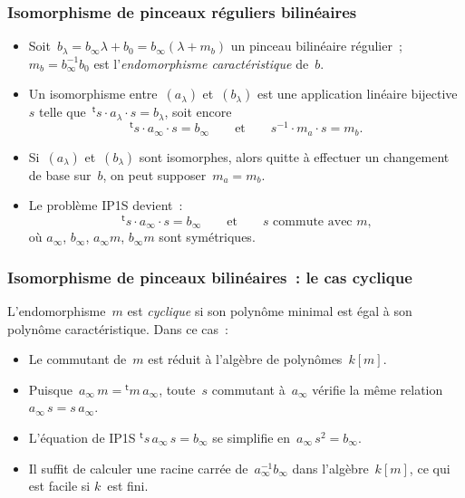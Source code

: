 \documentclass{beamer}%
\def\transpose{{}^{\mathrm{\scriptscriptstyle t}}\!}
\def\emphz#1{\emph{{\color{bleu}#1}}}
\let\mathrm\mathsf
\begin{document}
\begin{frame}\frametitle{Isomorphisme de pinceaux réguliers bilinéaires}%
\begin{itemize}
\item Soit~$b_{λ} = b_{∞} λ  + b_0 = b_{∞} ( λ + m_{b})$ un pinceau
bilinéaire régulier ; $m_{b} = b_{∞}^{-1} b_0$ est l'\emphz{endomorphisme
caractéristique} de~$b$.
\item Un isomorphisme entre~$(a_{λ})$ et~$(b_{λ})$ est une
application linéaire bijective~$s$ telle que~$\transpose{s} · a_{λ} · s =
b_{λ}$, soit encore
\begin{equation*}
\transpose{s} · a_{∞} · s = b_{∞} \qquad\text{et}\qquad
s^{-1} · m_{a} · s = m_{b}.
\end{equation*}
\item Si~$(a_{λ})$ et~$(b_{λ})$ sont isomorphes, alors quitte à effectuer
un changement de base sur~$b$, on peut supposer~$m_a = m_b$.
\item Le problème IP1S devient :
\begin{equation*}
\transpose{s} · a_{∞} · s = b_{∞} \qquad\text{et}\qquad
\text{$s$~commute avec~$m$,}
\end{equation*}
où $a_{∞}$, $b_{∞}$, $a_{∞} m$, $b_{∞} m$ sont symétriques.
\end{itemize}
\end{frame}%
\begin{frame}\frametitle{Isomorphisme de pinceaux bilinéaires : le %
cas cyclique}
L'endomorphisme~$m$ est \emphz{cyclique} si son polynôme minimal est égal
à son polynôme caractéristique. Dans ce cas :
\begin{itemize}
\item Le commutant de~$m$ est réduit à l'algèbre de polynômes~$k[m]$.
\item Puisque~$a_{∞}\,m = \transpose{m}\, a_{∞}$, toute~$s$
commutant à~$a_{∞}$ vérifie la même relation~$a_{∞}\,s = s\,a_{∞}$.
\item L'équation de IP1S $\transpose{s}\, a_{∞}\, s = b_{∞}$ se simplifie
en~$a_{∞}\, s^2 = b_{∞}$.
\item Il suffit de calculer une racine carrée de~$a_{∞}^{-1} b_{∞}$ dans
l'algèbre~$k[m]$, ce qui est facile si $k$~est fini.
\end{itemize}
\end{frame}%
\end{document}
